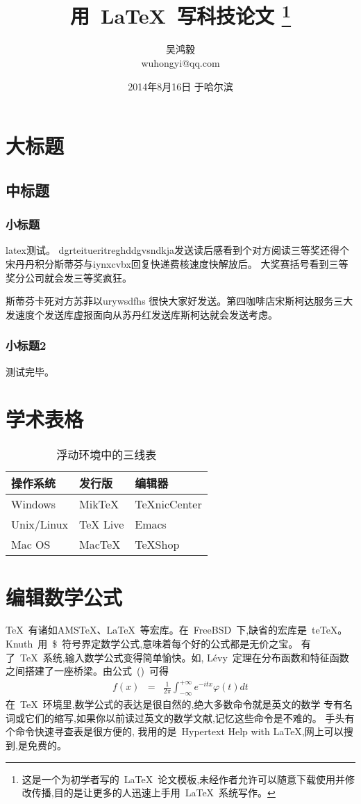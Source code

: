 \documentclass[11pt,a4paper,titlepage]{article}
\title{\kai\Huge 用~\LaTeX~写科技论文%
\thanks{\kai 这是一个为初学者写的~\LaTeX~论文模板,未经作者允许可以随意下载使用并修改传播,目的是让更多的人迅速上手用~\LaTeX~系统写作。}
}
\author{吴鸿毅\\
            wuhongyi@qq.com}
\date{\hei 2014年8月16日 于哈尔滨}
\begin{document}
\maketitle%
\tableofcontents %
\newpage%

\section{大标题}
\subsection{中标题}
\subsubsection{小标题}
latex{\Huge 测试}。 dgrteitueritreghddgvsndkja发送读后感看到个对方阅读三等奖还得个宋丹丹积分斯蒂芬与iynxcvbx回复快递费核速度快解放后。
大奖赛括号看到三等奖分公司就会发三等奖疯狂。

斯蒂芬卡死对方苏菲以urywsdfhs 很快大家好发送。第四咖啡店宋斯柯达服务三大发速度个发送库虚报面向从苏丹红发送库斯柯达就会发送考虑。
\subsubsection{小标题2}
测试完毕。

\section{学术表格}

\begin{table}[htbp]
\kai
\caption{\hei 浮动环境中的三线表}
\label{tab:threesome}
\centering
\begin{tabular}{lll}
\hline
操作系统& 发行版& 编辑器\\
\hline
Windows & MikTeX & TeXnicCenter \\
Unix/Linux & TeX Live & Emacs \\
Mac OS & MacTeX & TeXShop \\
\hline
\end{tabular}
\end{table} 

\section{编辑数学公式}
\indent%
\kai
\TeX~有诸如AMS\TeX、\LaTeX~等宏库。在~FreeBSD~下,缺省的宏库是~te\TeX。
Knuth~用~\$~符号界定数学公式,意味着每个好的公式都是无价之宝。
有了~\TeX~系统,输入数学公式变得简单愉快。如,
L\'{e}vy~定理在分布函数和特征函数之间搭建了一座桥梁。由公式~()~可得
\begin{eqnarray}
\label{DensityCharacteristic}%
f(x)&=&\frac{1}{2\pi}\int^{+\infty}_{-\infty} e^{-itx}\varphi(t)dt
\end{eqnarray}
 在~\TeX~环境里,数学公式的表达是很自然的,绝大多数命令就是英文的数学
专有名词或它们的缩写,如果你以前读过英文的数学文献,记忆这些命令是不难的。
手头有个命令快速寻查表是很方便的,
我用的是~Hypertext Help with \LaTeX,网上可以搜到,是免费的。
\end{document}
